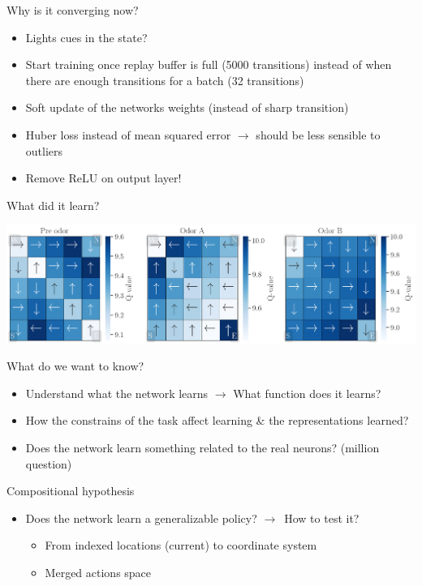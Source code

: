 \documentclass[bigger]{beamer}
\begin{document}
\begin{frame}[<+->][label={sec:org0595c4b}]{Why is it converging now?}
\begin{itemize}
\item Lights cues in the state?
\item Start training once replay buffer is full (5000 transitions) instead of when there are enough transitions for a batch (32 transitions)
\item Soft update of the networks weights (instead of sharp transition)
\item Huber loss instead of mean squared error \(\to\) should be less sensible to outliers
\item \alert{Remove ReLU on output layer!}
\end{itemize}
\end{frame}
\begin{frame}[label={sec:org91b2a66}]{What did it learn?}
\begin{center}
\includegraphics[width=\linewidth]{img/policy.png}
\end{center}
\end{frame}
\begin{frame}[<+->][label={sec:org469cde1}]{What do we want to know?}
\begin{itemize}
\item Understand what the network learns
\(\to\) What \alert{function} does it learns?
\item How the constrains of the task affect learning \& the representations learned?
\item Does the network learn something related to the real neurons? (million  question)
\end{itemize}
\end{frame}
\begin{frame}[<+->][label={sec:orge437b65}]{Compositional hypothesis}
\begin{itemize}
\item Does the network learn a generalizable policy? \(\to\)~How to test it?
\begin{itemize}
\item From indexed locations (current) to coordinate system
\item Merged actions space
\end{itemize}
\end{itemize}
\end{frame}
\end{document}
